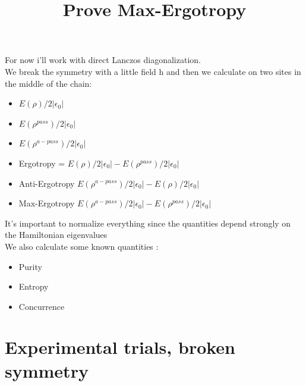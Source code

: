 \documentclass[12pt,a4paper]{article}
\title{Prove Max-Ergotropy}
\author{}
\begin{document}
	\maketitle


	For now i'll work with direct Lanczos diagonalization. \\
	We break the symmetry with a little field h and then we calculate on two sites in the middle of the chain:
	\begin{itemize}
		\item $E(\rho)/2|\epsilon_0|$
		\item $E(\rho^{pass})/2|\epsilon_0|$
		\item $E(\rho^{a-pass})/2|\epsilon_0|$
	\end{itemize}
	\begin{itemize}
		\item Ergotropy = $E(\rho)/2|\epsilon_0| -E(\rho^{pass})/2|\epsilon_0|$
		\item Anti-Ergotropy $E(\rho^{a-pass})/2|\epsilon_0|-E(\rho)/2|\epsilon_0|$
		\item Max-Ergotropy $E(\rho^{a-pass})/2|\epsilon_0|-E(\rho^{pass})/2|\epsilon_0|$
	\end{itemize} 
 It's important to normalize everything  since the quantities depend strongly on the Hamiltonian eigenvalues\\
 
	We also calculate some known quantities :
	\begin{itemize}
		\item Purity
		\item Entropy
		\item Concurrence
	\end{itemize}

	\newpage
	\section{Experimental trials, broken symmetry}
\end{document}
